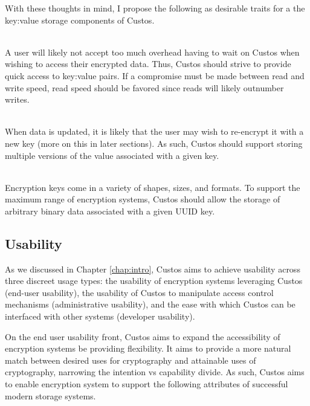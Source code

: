 With these thoughts in mind, I propose the following as desirable
traits for a the key:value storage components of Custos.

\begin{packed_desc}
\item[Fast Access] \hfill \\ A user will likely not accept too much
  overhead having to wait on Custos when wishing to access their
  encrypted data. Thus, Custos should strive to provide quick access
  to key:value pairs. If a compromise must be made between read and
  write speed, read speed should be favored since reads will likely
  outnumber writes.
\item[Versioned Data] \hfill \\ When data is updated, it is likely
  that the user may wish to re-encrypt it with a new key (more on this
  in later sections). As such, Custos should support storing multiple
  versions of the value associated with a given key.
\item[Arbitrary Data] \hfill \\ Encryption keys come in a variety of
  shapes, sizes, and formats. To support the maximum range of
  encryption systems, Custos should allow the storage of arbitrary
  binary data associated with a given UUID key.
\end{packed_desc}

\subsection{Usability}

As we discussed in Chapter \ref{chap:intro}, Custos aims to achieve
usability across three discreet usage types: the usability of
encryption systems leveraging Custos (end-user usability), the
usability of Custos to manipulate access control mechanisms
(administrative usability), and the ease with which Custos can be
interfaced with other systems (developer usability).

On the end user usability front, Custos aims to expand the
accessibility of encryption systems be providing flexibility. It aims
to provide a more natural match between desired uses for cryptography
and attainable uses of cryptography, narrowing the intention vs
capability divide. As such, Custos aims to enable encryption system to
support the following attributes of successful modern storage systems.

